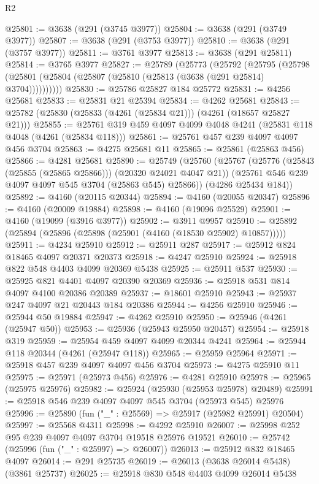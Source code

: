 \begin{lexlean}{R2}
\begin{coremodule}
@25801 := @3638 (@291 (@3745 @3977))
@25804 := @3638 (@291 (@3749 @3977))
@25807 := @3638 (@291 (@3753 @3977))
@25810 := @3638 (@291 (@3757 @3977))
@25811 := @3761 @3977
@25813 := @3638 (@291 @25811)
@25814 := @3765 @3977
@25827 := @25789
    (@25773
      (@25792
        (@25795 (@25798 (@25801 (@25804 (@25807 (@25810 (@25813 (@3638 (@291 @25814) @3704))))))))))
@25830 := @25786 @25827 @184 @25772
@25831 := @4256 @25681
@25833 := @25831 @21 @25394
@25834 := @4262 @25681
@25843 := @25782 (@25830 (@25833 (@4261 (@25834 @21))) (@4261 (@18657 @25827 @21)))
@25855 := @25761 @319 @459 @4097 @4099 @4048 @4241 (@25831 @118 @4048 (@4261 (@25834 @118)))
@25861 := @25761 @457 @239 @4097 @4097 @456 @3704
@25863 := @4275 @25681 @11
@25865 := @25861 (@25863 @456)
@25866 := @4281 @25681
@25890 := @25749
    (@25760
      (@25767
        (@25776 (@25843 (@25855 (@25865 @25866))) (@20320 @24021 @4047 @21))
        (@25761 @546 @239 @4097 @4097 @545 @3704 (@25863 @545) @25866))
      (@4286 @25434 @184))
@25892 := @4160 (@20115 @20344)
@25894 := @4160 (@20055 @20347)
@25896 := @4160 (@20009 @19884)
@25898 := @4160 (@19096 @25529)
@25901 := @4160 (@19099 (@3916 @3977))
@25902 := @3911 @9957
@25910 := @25892 (@25894 (@25896 (@25898 (@25901 (@4160 (@18530 @25902) @10857)))))
@25911 := @4234 @25910
@25912 := @25911 @287
@25917 := @25912 @824 @18465 @4097 @20371 @20373
@25918 := @4247 @25910
@25924 := @25918 @822 @548 @4403 @4099 @20369 @5438
@25925 := @25911 @537
@25930 := @25925 @821 @4401 @4097 @20390 @20369
@25936 := @25918 @531 @814 @4097 @4100 @20386 @20389
@25937 := @18601 @25910
@25943 := @25937 @247 @4097 @21 @20443 @184 @20386
@25944 := @4256 @25910
@25946 := @25944 @50 @19884
@25947 := @4262 @25910
@25950 := @25946 (@4261 (@25947 @50))
@25953 := @25936 (@25943 @25950 @20457)
@25954 := @25918 @319
@25959 := @25954 @459 @4097 @4099 @20344 @4241
@25964 := @25944 @118 @20344 (@4261 (@25947 @118))
@25965 := @25959 @25964
@25971 := @25918 @457 @239 @4097 @4097 @456 @3704
@25973 := @4275 @25910 @11
@25975 := @25971 (@25973 @456)
@25976 := @4281 @25910
@25978 := @25965 (@25975 @25976)
@25982 := @25924 (@25930 (@25953 @25978) @20489)
@25991 := @25918 @546 @239 @4097 @4097 @545 @3704 (@25973 @545) @25976
@25996 := @25890 (fun ("_" : @25569) => @25917 (@25982 @25991) @20504)
@25997 := @25568 @4311
@25998 := @4292 @25910
@26007 := @25998 @252 @95 @239 @4097 @4097 @3704 @19518 @25976 @19521
@26010 := @25742 (@25996 (fun ("_" : @25997) => @26007))
@26013 := @25912 @832 @18465 @4097
@26014 := @291 @25735
@26019 := @26013 (@3638 @26014 @5438) (@3861 @25737)
@26025 := @25918 @830 @548 @4403 @4099 @26014 @5438

\end{coremodule}
\end{lexlean}
